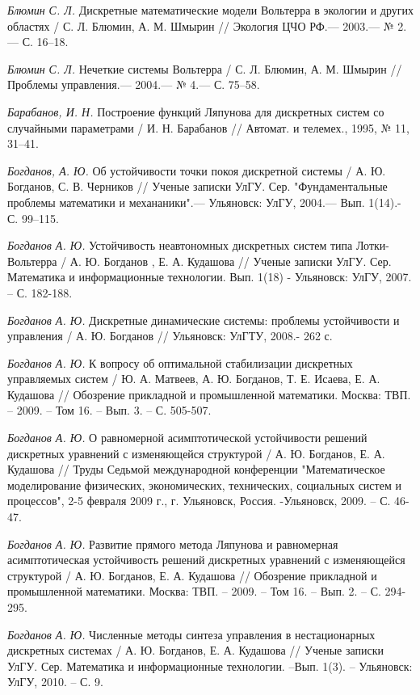 \begin{thebibliography}{10}
	{\it Блюмин С. Л.} Дискретные математические модели Вольтерра в экологии и других областях /
	С. Л. Блюмин, А. М. Шмырин // Экология ЦЧО РФ.— 2003.— № 2.—
	С. 16–18.
	
	{\it Блюмин С. Л.} Нечеткие системы Вольтерра /
	С. Л. Блюмин, А. М. Шмырин // Проблемы управления.— 2004.— № 4.—
	С. 75–58.
	
	{\it Барабанов, И. Н.} Построение функций Ляпунова для дискретных систем со случайными параметрами / И. Н. Барабанов // Автомат. и телемех., 1995, № 11, 31–41.
	
	{\it Богданов, А. Ю.} Об устойчивости точки покоя дискретной системы / А. Ю. Богданов, С. В. Черников // Ученые записки УлГУ. Сер. "Фундаментальные проблемы математики и механаники".— Ульяновск: УлГУ, 2004.— Вып. 1(14).- С. 99–115.
	

	{\it Богданов А. Ю.} Устойчивость неавтономных дискретных систем типа Лотки-Вольтерра / А. Ю. Богданов , Е. А. Кудашова //
	Ученые записки УлГУ. Сер. Математика и информационные технологии. Вып. 1(18) - Ульяновск: УлГУ, 2007. – С. 182-188.
	
	{\it Богданов А. Ю.} Дискретные динамические системы: проблемы устойчивости и управления / А. Ю. Богданов //
	Ульяновск: УлГТУ, 2008.- 262 с.
	
	{\it Богданов А. Ю.} К вопросу об оптимальной стабилизации дискретных управляемых систем / Ю. А. Матвеев, А. Ю. Богданов, Т. Е. Исаева, Е. А. Кудашова  //
	Обозрение прикладной и промышленной математики.  Москва: ТВП. – 2009. – Том 16. – Вып. 3. – С. 505-507.
	
	{\it Богданов А. Ю.} О равномерной асимптотической устойчивости решений дискретных уравнений с изменяющейся структурой / А. Ю. Богданов, Е. А. Кудашова //
	Труды Седьмой международной конференции "Математическое моделирование физических, экономических, технических, социальных систем и процессов", 2-5 февраля 2009 г., г. Ульяновск, Россия. -Ульяновск, 2009. – С. 46-47.
	
	{\it Богданов А. Ю.} Развитие прямого метода Ляпунова и равномерная асимптотическая устойчивость решений дискретных уравнений с изменяющейся структурой / А. Ю. Богданов, Е. А. Кудашова //
	Обозрение прикладной и промышленной математики.  Москва: ТВП. – 2009. – Том 16. – Вып. 2. – С. 294-295.
	
	{\it Богданов А. Ю.} Численные методы синтеза управления в нестационарных дискретных системах / А. Ю. Богданов, Е. А. Кудашова //
	Ученые записки УлГУ. Сер. Математика и информационные технологии. –Вып. 1(3). – Ульяновск: УлГУ, 2010. – С. 9.
	

\end{thebibliography}
